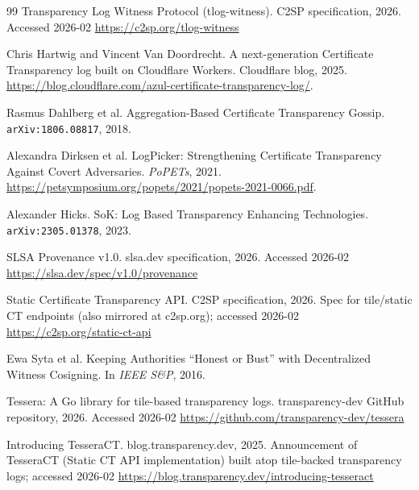 \documentclass[11pt]{article}
\begin{document}
\begin{thebibliography}{99}
\newblock Transparency Log Witness Protocol (tlog-witness).
\newblock C2SP specification, 2026.
\newblock Accessed 2026-02
\newblock \url{https://c2sp.org/tlog-witness}

Chris Hartwig and Vincent Van Doordrecht.
\newblock A next-generation Certificate Transparency log built on Cloudflare Workers.
\newblock Cloudflare blog, 2025.
\newblock \url{https://blog.cloudflare.com/azul-certificate-transparency-log/}.

Rasmus Dahlberg et al.
\newblock Aggregation-Based Certificate Transparency Gossip.
\newblock \texttt{arXiv:1806.08817}, 2018.

Alexandra Dirksen et al.
\newblock LogPicker: Strengthening Certificate Transparency Against Covert Adversaries.
\newblock \emph{PoPETs}, 2021.
\newblock \url{https://petsymposium.org/popets/2021/popets-2021-0066.pdf}.

Alexander Hicks.
\newblock SoK: Log Based Transparency Enhancing Technologies.
\newblock \texttt{arXiv:2305.01378}, 2023.

\newblock SLSA Provenance v1.0.
\newblock slsa.dev specification, 2026.
\newblock Accessed 2026-02
\newblock \url{https://slsa.dev/spec/v1.0/provenance}

\newblock Static Certificate Transparency API.
\newblock C2SP specification, 2026.
\newblock Spec for tile/static CT endpoints (also mirrored at c2sp.org); accessed 2026-02
\newblock \url{https://c2sp.org/static-ct-api}

Ewa Syta et al.
\newblock Keeping Authorities ``Honest or Bust'' with Decentralized Witness Cosigning.
\newblock In \emph{IEEE S\&P}, 2016.

\newblock Tessera: A Go library for tile-based transparency logs.
\newblock transparency-dev GitHub repository, 2026.
\newblock Accessed 2026-02
\newblock \url{https://github.com/transparency-dev/tessera}

\newblock Introducing TesseraCT.
\newblock blog.transparency.dev, 2025.
\newblock Announcement of TesseraCT (Static CT API implementation) built atop tile-backed transparency logs; accessed 2026-02
\newblock \url{https://blog.transparency.dev/introducing-tesseract}

\end{thebibliography}
\end{document}
